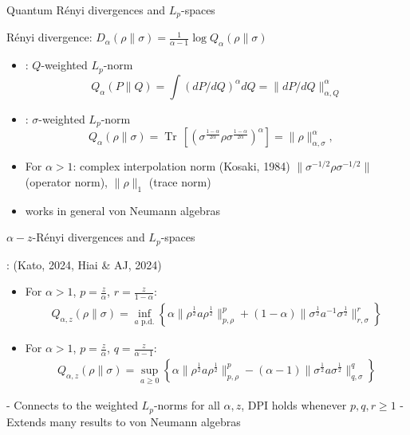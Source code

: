 \documentclass[mathserif]{beamer}
\newcommand{\<}{\langle}
\renewcommand{\>}{\rangle}
\newcommand{\Tr}{\operatorname{Tr}\,}
\begin{document}
\begin{frame}{Quantum R\'enyi divergences and $L_p$-spaces}

R\'enyi divergence: $D_\alpha(\rho\|\sigma)=\frac1{\alpha-1}\log Q_{\alpha}(\rho\|\sigma)$

\bigskip

\begin{itemize}
\item {}: $Q$-weighted $L_p$-norm 
\[
Q_\alpha(P\|Q)=\int \left(dP/dQ\right)^\alpha
dQ=\|dP/dQ\|_{\alpha,Q}^\alpha
\]
\item {}: $\sigma$-weighted $L_p$-norm
\[
Q_\alpha(\rho\|\sigma)=\Tr\left[\left(
\sigma^{\frac{1-\alpha}{2\alpha}}\rho\sigma^{\frac{1-\alpha}{2\alpha}}\right)^\alpha\right]=\|\rho\|^\alpha_{\alpha,\sigma},\quad
\]
\item For $\alpha>1$: complex interpolation norm {\small (Kosaki, 1984)}
\vskip 3mm
 $\|\sigma^{-1/2}\rho\sigma^{-1/2}\|$ (operator norm),  $\|\rho\|_1$ (trace norm)

\item works in general von Neumann algebras
\end{itemize}


\end{frame}

\begin{frame}{$\alpha-z$-R\'enyi divergences and $L_p$-spaces}

: {\small (Kato, 2024, Hiai \& AJ, 2024)}

\bigskip

\begin{itemize}
\item For $\alpha>1$, $p=\frac{z}{\alpha}$, $r=\frac{z}{1-\alpha}$:
\begin{multline*}
Q_{\alpha,z}(\rho\|\sigma)=\inf_{a
\text{ p.d.}}\left\{\alpha\|\rho^{\frac 12}a\rho^{\frac
12}\|^p_{p,\rho}+(1-\alpha)\|\sigma^{\frac 12}a^{-1}\sigma^{\frac 12}\|^r_{r,\sigma}\right\}
\end{multline*}

\item For $\alpha>1$, $p=\frac{z}{\alpha}$, $q=\frac{z}{\alpha-1}$:
\begin{multline*}
Q_{\alpha,z}(\rho\|\sigma)=\sup_{a\ge 0} \left\{\alpha\|\rho^{\frac 12}a\rho^{\frac
12}\|^p_{p,\rho}- (\alpha-1)\|\sigma^{\frac 12}a\sigma^{\frac 12}\|^q_{q,\sigma}
 \right\}
\end{multline*}

\end{itemize}

\medskip

- Connects to the weighted $L_p$-norms for all $\alpha, z$, DPI holds whenever $p,q,r\ge 1$
\vskip 3mm
- Extends many results to von Neumann algebras

\end{frame}
\end{document}
